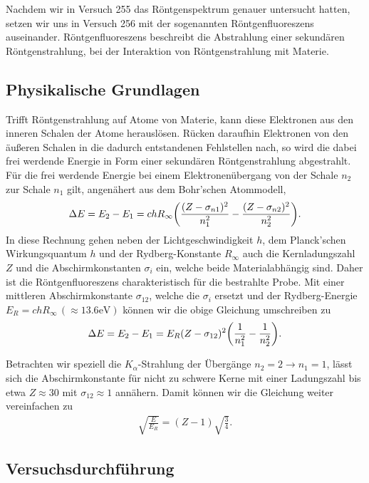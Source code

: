 Nachdem wir in Versuch 255 das Röntgenspektrum genauer untersucht hatten, setzen wir uns in Versuch 256 mit der sogenannten Röntgenfluoreszens auseinander. Röntgenfluoreszens beschreibt die Abstrahlung einer sekundären Röntgenstrahlung, bei der Interaktion von Röntgenstrahlung mit Materie.


\subsection{Physikalische Grundlagen}

Trifft Röntgenstrahlung auf Atome von Materie, kann diese Elektronen aus den inneren Schalen der Atome herauslösen. Rücken daraufhin Elektronen von den äußeren Schalen in die dadurch entstandenen Fehlstellen nach, so wird die dabei frei werdende Energie in Form einer sekundären Röntgenstrahlung abgestrahlt. Für die frei werdende Energie bei einem Elektronenübergang von der Schale $n_2$ zur Schale $n_1$ gilt, angenähert aus dem Bohr'schen Atommodell,
\begin{align}
  \Delta E = E_{2} - E_{1} = ch R_{\infty} \qty(\frac{(Z- \sigma_{n1})^2}{n_1^2} - \frac{(Z- \sigma_{n2})^2}{n_2^2}).
\end{align}
In diese Rechnung gehen neben der Lichtgeschwindigkeit $h$, dem Planck'schen Wirkungsquantum $h$ und der Rydberg-Konstante $R_{\infty}$ auch die Kernladungszahl $Z$ und die Abschirmkonstanten $\sigma_i$ ein, welche beide Materialabhängig sind. Daher ist die Röntgenfluoreszens charakteristisch für die bestrahlte Probe. Mit einer mittleren Abschirmkonstante $\sigma_{12}$, welche die $\sigma_{i}$ ersetzt und der Rydberg-Energie $E_{R} = ch R_{\infty}\, (\approx 13.6\si{\electronvolt})$ können wir die obige Gleichung umschreiben zu
\begin{align}
  \Delta E = E_2 - E_1 = E_{R} (Z - \sigma_{12})^2 \qty(\frac{1}{n_1^2} - \frac{1}{n_2^2}).
\end{align}

Betrachten wir speziell die $K_{\alpha}$-Strahlung der Übergänge $n_{2} = 2\to n_{1} = 1$, lässt sich die Abschirmkonstante für nicht zu schwere Kerne mit einer Ladungszahl bis etwa $Z \approx 30$ mit $\sigma_{12} \approx 1$ annähern. Damit können wir die Gleichung weiter vereinfachen zu
\begin{align}
  \sqrt{\frac{E}{E_R}} = (Z - 1) \sqrt{\frac{3}{4}}.
\end{align}

\subsection{Versuchsdurchführung}